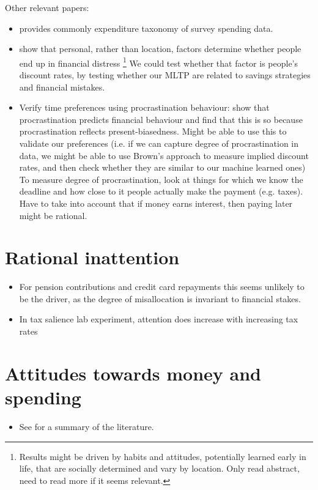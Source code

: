 \documentclass[a4paper, 11pt]{report}
\begin{document}
Other relevant papers:
\begin{itemize}
	\item \citet{lusardi1996permanent} provides commonly expenditure taxonomy of survey spending data.

    \item \citet{keys2020determines} show that personal, rather than location, factors determine whether people end up in financial distress \footnote{Results might be driven by habits and attitudes, potentially learned early in life, that are socially determined and vary by location. Only read abstract, need to read more if it seems relevant.} We could test whether that factor is people's discount rates, by testing whether our MLTP are related to savings strategies and financial mistakes.

    \item Verify time preferences using procrastination behaviour: \citet{brown2015procrastination} show that procrastination predicts financial behaviour and find that this is so because procrastination reflects present-biasedness. Might be able to use this to validate our preferences (i.e. if we can capture degree of procrastination in data, we might be able to use Brown's approach to measure implied discount rates, and then check whether they are similar to our machine learned ones) To measure degree of procrastination, look at things for which we know the deadline and how close to it people actually make the payment (e.g. taxes). Have to take into account that if money earns interest, then paying later might be rational.
\end{itemize}


\section{Rational inattention}
\begin{itemize}
	\item For pension contributions \citep{chetty2014active} and credit card repayments \citep{gathergood2019individuals} this seems unlikely to be the driver, as the degree of misallocation is invariant to financial stakes.

	\item In tax salience lab experiment, attention does increase with increasing tax rates \citep{taubinsky2018attention}
\end{itemize}


\section{Attitudes towards money and spending}
\begin{itemize}
	\item See \citet{greenberg2019financial} for a summary of the literature.
\end{itemize}
\end{document}
